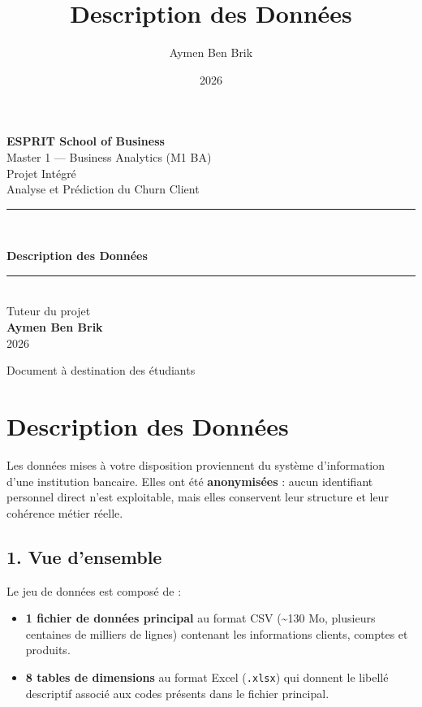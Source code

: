 \documentclass[11pt,a4paper]{article}
\title{\color{primary}\textbf{Description des Données}}
\author{Aymen Ben Brik}
\date{2026}
\providecommand{\tightlist}{\setlength{\itemsep}{0pt}\setlength{\parskip}{0pt}}
\begin{document}
\begin{titlepage}
\centering
\vspace*{1.5cm}

{\Large\bfseries ESPRIT School of Business}\\[0.3cm]
{\large Master 1 --- Business Analytics (M1 BA)}\\[2cm]

{\color{gray}\large Projet Intégré}\\[0.3cm]
{\color{gray}\large Analyse et Prédiction du Churn Client}\\[2.2cm]

\rule{0.85\linewidth}{1.2pt}\\[0.6cm]
{\Huge\bfseries\color{primary} Description des Données\par}
\rule{0.85\linewidth}{1.2pt}\\[2cm]

{\large Tuteur du projet}\\[0.2cm]
{\Large\bfseries Aymen Ben Brik}\\[1cm]
{\large 2026}

\vfill
{\color{gray}\small Document à destination des étudiants}
\end{titlepage}

\tableofcontents
\newpage

\section{Description des Données}\label{description-des-donnuxe9es}

Les données mises à votre disposition proviennent du système
d'information d'une institution bancaire. Elles ont été
\textbf{anonymisées} : aucun identifiant personnel direct n'est
exploitable, mais elles conservent leur structure et leur cohérence
métier réelle.

\subsection{1. Vue d'ensemble}\label{vue-densemble}

Le jeu de données est composé de :

\begin{itemize}
\tightlist
\item
  \textbf{1 fichier de données principal} au format CSV
  (\textasciitilde130 Mo, plusieurs centaines de milliers de lignes)
  contenant les informations clients, comptes et produits.
\item
  \textbf{8 tables de dimensions} au format Excel (\texttt{.xlsx}) qui
  donnent le libellé descriptif associé aux codes présents dans le
  fichier principal.
\end{itemize}
\end{document}
